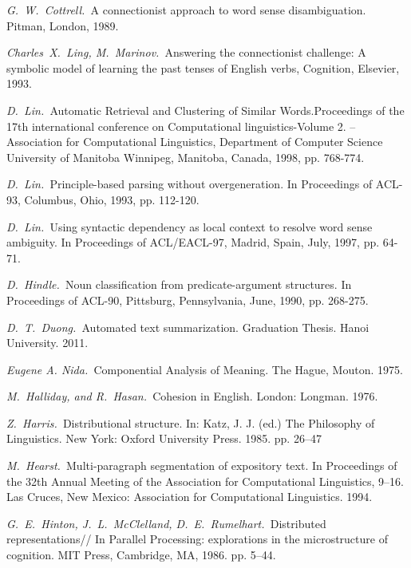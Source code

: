 \documentclass{article}
\begin{document}
\begin{articletext}
\begin{thebibliography}{9}
\textit{G.~W.~Cottrell.~}A connectionist approach to word sense disambiguation. Pitman, London, 1989.

\textit{Charles~X.~Ling, M.~Marinov.~}Answering the connectionist challenge: A symbolic model of learning the past tenses of English verbs,  Cognition, Elsevier, 1993.

\textit{D.~Lin.~}Automatic Retrieval and Clustering of Similar Words.Proceedings of the 17th international conference on Computational linguistics-Volume 2. – Association for Computational Linguistics, Department of Computer Science University of Manitoba Winnipeg, Manitoba, Canada, 1998, pp. 768-774.

\textit{D.~Lin.~}Principle-based parsing without overgeneration. In Proceedings of ACL-93, Columbus, Ohio, 1993, pp. 112-120.

\textit{D.~Lin.~}Using syntactic dependency as local context to resolve word sense ambiguity. In Proceedings of ACL/EACL-97, Madrid, Spain, July, 1997, pp. 64-71.

\textit{D.~Hindle.~}Noun classification from predicate-argument structures. In Proceedings of ACL-90, Pittsburg, Pennsylvania, June, 1990, pp. 268-275.

\textit{D.~T.~Duong.~}Automated text summarization. Graduation Thesis. Hanoi University. 2011. 

\textit{Eugene A. Nida.~}Componential Analysis of Meaning. The Hague, Mouton. 1975. 

\textit{M.~Halliday, and R.~Hasan.~}Cohesion in English. London: Longman. 1976. 

\textit{Z.~Harris.~}Distributional structure. In: Katz, J. J. (ed.) The Philosophy of Linguistics. New York: Oxford University Press. 1985. pp. 26–47

\textit{M.~Hearst.~}Multi-paragraph segmentation of expository text. In Proceedings of the 32th Annual Meeting of the Association for Computational Linguistics, 9–16. Las Cruces, New Mexico: Association for Computational Linguistics. 1994. 

\textit{G.~E.~Hinton, J.~L.~McClelland, D.~E.~Rumelhart.~}Distributed representations// In Parallel Processing: explorations in the microstructure of cognition. MIT Press, Cambridge, MA, 1986. pp. 5–44.


\end{thebibliography}
\end{articletext}
\end{document}
